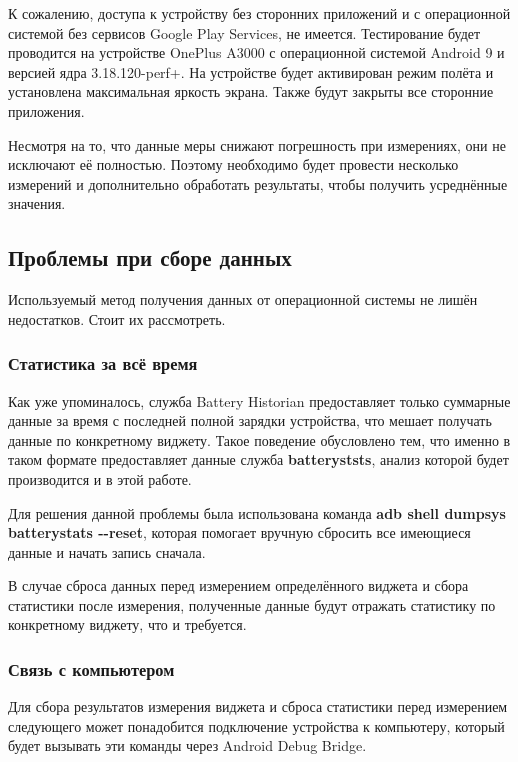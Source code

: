 \documentclass[a4paper,14pt]{extarticle} %
\begin{document}
	К сожалению, доступа к устройству без сторонних приложений и с операционной системой без сервисов Google Play Services, не имеется. Тестирование будет проводится на устройстве OnePlus A3000 с операционной системой Android 9 и версией ядра 3.18.120-perf+. На устройстве будет активирован режим полёта и установлена максимальная яркость экрана. Также будут закрыты все сторонние приложения.

	Несмотря на то, что данные меры снижают погрешность при измерениях, они не исключают её полностью. Поэтому необходимо будет провести несколько измерений и дополнительно обработать результаты, чтобы получить усреднённые значения.
	
	\subsection{Проблемы при сборе данных}
	
	Используемый метод получения данных от операционной системы не лишён недостатков. Стоит их рассмотреть.
	
	\subsubsection{Статистика за всё время}
	
	Как уже упоминалось, служба Battery Historian предоставляет только суммарные данные за время с последней полной зарядки устройства, что мешает получать данные по конкретному виджету. Такое поведение обусловлено тем, что именно в таком формате предоставляет данные служба \textbf{batteryststs}, анализ которой будет производится и в этой работе.
	
	Для решения данной проблемы была использована команда \textbf{adb shell dumpsys batterystats -{}-reset}, которая помогает вручную сбросить все имеющиеся данные и начать запись сначала. 
	
	В случае сброса данных перед измерением определённого виджета и сбора статистики после измерения, полученные данные будут отражать статистику по конкретному виджету, что и требуется.
	
	\subsubsection{Связь с компьютером} \label{subsub:connection}
	
	Для сбора результатов измерения виджета и сброса статистики перед измерением следующего может понадобится подключение устройства к компьютеру, который будет вызывать эти команды через Android Debug Bridge.
	
\end{document}
